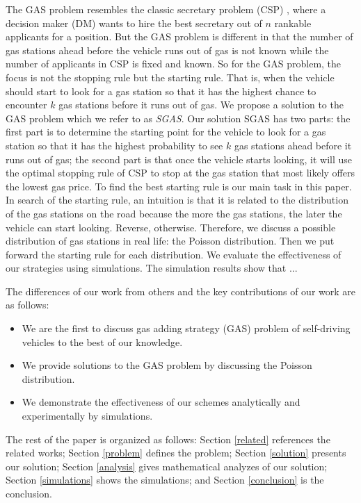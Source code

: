 \documentclass[conference]{IEEEtran}
\theoremstyle{definition}
\begin{document}
The GAS problem resembles the classic secretary problem (CSP) \cite{CSP}, where a decision maker (DM) wants to hire the best secretary out of $n$ rankable applicants for a position. But the GAS problem is different in that the number of gas stations ahead before the vehicle runs out of gas is not known while the number of applicants in CSP is fixed and known. So for the GAS problem, the focus is not the stopping rule but the starting rule. That is,  when the vehicle should start to look for a gas station so that it has the highest chance to encounter $k$ gas stations  before it runs out of gas. We propose a solution to the GAS problem which we refer to as {\em SGAS}. Our solution SGAS has two parts: the first part is to determine the starting point for the vehicle to look for a gas station so that it has the highest probability to see $k$ gas stations ahead before it runs out of gas; the second part is that once the vehicle starts looking, it will use the optimal stopping rule of CSP to stop at the gas station that most likely offers the lowest gas price. To find the best starting rule is our main task in this paper. In search of the starting rule, an intuition is that it is related to the distribution of the gas stations on the road because the more the gas stations, the later the vehicle can start looking. Reverse, otherwise. Therefore, we discuss a possible distribution of gas stations in real life:  the Poisson distribution. Then we put forward the starting rule for each distribution.  We evaluate the effectiveness of our strategies using simulations. The simulation results show that ...

The differences of our work from others and the key contributions of our work are as follows:
\begin{itemize}
\item We are the first to discuss gas adding strategy (GAS) problem of self-driving vehicles to the best of our knowledge.
\item We provide solutions to the GAS problem by discussing the Poisson distribution.
\item We demonstrate the effectiveness of our schemes analytically and experimentally by simulations.
\end{itemize}

The rest of the paper is organized as follows: Section \ref{related} references the related works;  Section \ref{problem} defines the problem;  Section \ref{solution} presents our solution;  Section \ref{analysis} gives mathematical analyzes of our solution;  Section \ref{simulations} shows the simulations; and Section \ref{conclusion} is the conclusion.
\end{document}
